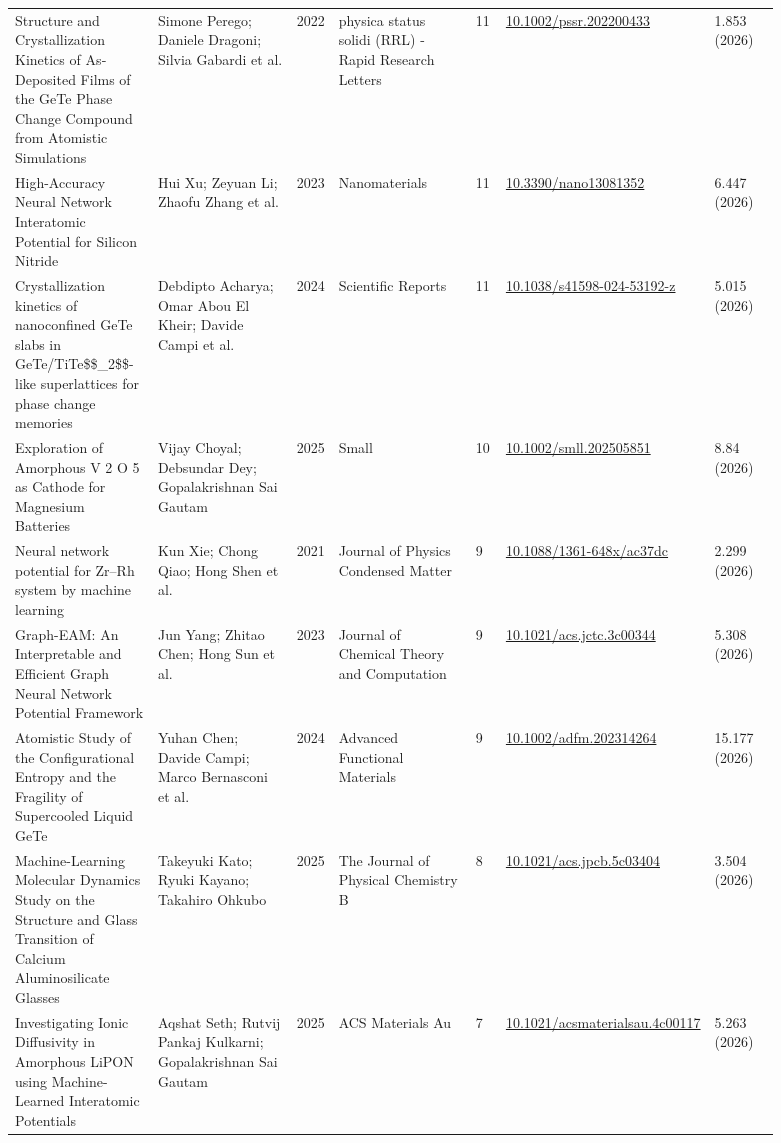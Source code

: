 \documentclass[10pt,a4paper]{article}
\begin{document}
{\begin{longtable}{p{0.192\linewidth}p{0.192\linewidth}p{0.043\linewidth}p{0.192\linewidth}p{0.043\linewidth}p{0.132\linewidth}p{0.096\linewidth}}
Structure and Crystallization Kinetics of As‐Deposited Films of the GeTe Phase Change Compound from Atomistic Simulations & Simone Perego; Daniele Dragoni; Silvia Gabardi et al. & 2022 & physica status solidi (RRL) - Rapid Research Letters & 11 & \href{https://doi.org/10.1002/pssr.202200433}{10.1002/pssr.202200433} & 1.853 (2026) \\
High-Accuracy Neural Network Interatomic Potential for Silicon Nitride & Hui Xu; Zeyuan Li; Zhaofu Zhang et al. & 2023 & Nanomaterials & 11 & \href{https://doi.org/10.3390/nano13081352}{10.3390/nano13081352} & 6.447 (2026) \\
Crystallization kinetics of nanoconfined GeTe slabs in GeTe/TiTe\$\$\_2\$\$-like superlattices for phase change memories & Debdipto Acharya; Omar Abou El Kheir; Davide Campi et al. & 2024 & Scientific Reports & 11 & \href{https://doi.org/10.1038/s41598-024-53192-z}{10.1038/s41598-024-53192-z} & 5.015 (2026) \\
Exploration of Amorphous V 2 O 5 as Cathode for Magnesium Batteries & Vijay Choyal; Debsundar Dey; Gopalakrishnan Sai Gautam & 2025 & Small & 10 & \href{https://doi.org/10.1002/smll.202505851}{10.1002/smll.202505851} & 8.84 (2026) \\
Neural network potential for Zr–Rh system by machine learning & Kun Xie; Chong Qiao; Hong Shen et al. & 2021 & Journal of Physics Condensed Matter & 9 & \href{https://doi.org/10.1088/1361-648x/ac37dc}{10.1088/1361-648x/ac37dc} & 2.299 (2026) \\
Graph-EAM: An Interpretable and Efficient Graph Neural Network Potential Framework & Jun Yang; Zhitao Chen; Hong Sun et al. & 2023 & Journal of Chemical Theory and Computation & 9 & \href{https://doi.org/10.1021/acs.jctc.3c00344}{10.1021/acs.jctc.3c00344} & 5.308 (2026) \\
Atomistic Study of the Configurational Entropy and the Fragility of Supercooled Liquid GeTe & Yuhan Chen; Davide Campi; Marco Bernasconi et al. & 2024 & Advanced Functional Materials & 9 & \href{https://doi.org/10.1002/adfm.202314264}{10.1002/adfm.202314264} & 15.177 (2026) \\
Machine-Learning Molecular Dynamics Study on the Structure and Glass Transition of Calcium Aluminosilicate Glasses & Takeyuki Kato; Ryuki Kayano; Takahiro Ohkubo & 2025 & The Journal of Physical Chemistry B & 8 & \href{https://doi.org/10.1021/acs.jpcb.5c03404}{10.1021/acs.jpcb.5c03404} & 3.504 (2026) \\
Investigating Ionic Diffusivity in Amorphous LiPON using Machine-Learned Interatomic Potentials & Aqshat Seth; Rutvij Pankaj Kulkarni; Gopalakrishnan Sai Gautam & 2025 & ACS Materials Au & 7 & \href{https://doi.org/10.1021/acsmaterialsau.4c00117}{10.1021/acsmaterialsau.4c00117} & 5.263 (2026) \\

\end{longtable}}
\end{document}
